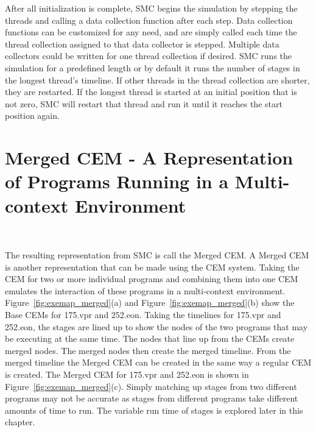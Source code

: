 After all initialization is complete, SMC begins the simulation by
stepping the threads and calling a data collection function after each
step. Data collection functions can be customized for any need, and
are simply called each time the thread collection assigned to that
data collector is stepped. Multiple data collectors could be written
for one thread collection if desired.  SMC runs the simulation for a predefined
length or by default it runs the 
number of stages in the longest thread's timeline. If other threads in
the thread collection are shorter, they are restarted. If the longest
thread is started at an initial position that is not zero, SMC will
restart that thread and run it until it reaches the start position
again.

\section{Merged CEM - A Representation of Programs Running in a Multi-context
Environment}~\label{sec:simmc_merged}

The resulting representation from SMC is call the Merged CEM.
A Merged CEM is another representation that can be made using the CEM system.
Taking the CEM for two or more individual programs and combining them into one CEM
emulates the interaction of these programs in a multi-context environment.
Figure~\ref{fig:exemap_merged}(a) and Figure~\ref{fig:exemap_merged}(b) show
the Base CEMs for 175.vpr and 252.eon.
Taking the timelines for 175.vpr and 252.eon, the stages are lined up to show
the nodes of the two programs that may be executing at the same time.
The nodes that line up from the CEMs create merged nodes. The merged nodes then
create the merged timeline. From the merged timeline the Merged CEM can be
created in the same way a regular CEM is created.
The Merged CEM for 175.vpr and 252.eon is shown in
Figure~\ref{fig:exemap_merged}(c). Simply matching up stages from two different
programs may not be accurate as stages from different programs take different
amounts of time to run. The variable run time of stages is explored later in this
chapter.


